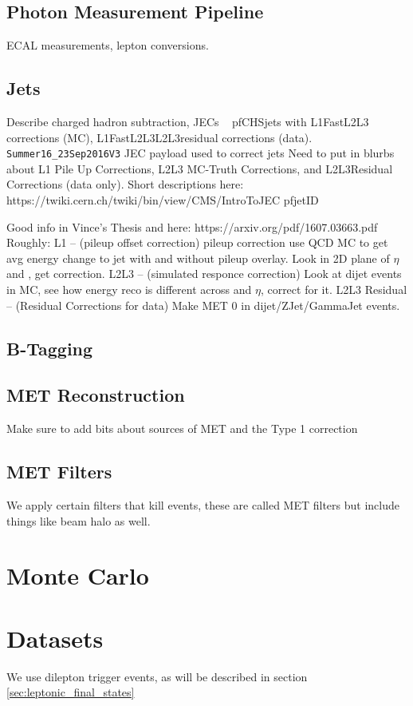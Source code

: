   \subsection{Photon Measurement Pipeline}
    ECAL measurements, lepton conversions.
  \subsection{Jets} \label{sec:jets}
    Describe charged hadron subtraction, JECs ~\cite{JERC}
    pfCHSjets with L1FastL2L3 corrections (MC), L1FastL2L3L2L3residual corrections (data).
    \verb=Summer16_23Sep2016V3= JEC payload used to correct jets
    Need to put in blurbs about L1 Pile Up Corrections, L2L3 MC-Truth Corrections, and L2L3Residual Corrections (data only). Short descriptions here: https://twiki.cern.ch/twiki/bin/view/CMS/IntroToJEC
    pfjetID


    Good info in Vince's Thesis and here: https://arxiv.org/pdf/1607.03663.pdf
    Roughly: L1 -- (pileup offset correction) pileup correction use QCD MC to get avg energy change to jet with and without pileup overlay. Look in 2D plane of $\eta$ and \pt, get correction.
    L2L3 -- (simulated responce correction) Look at dijet events in MC, see how energy reco is different across \pt and $\eta$, correct for it.
    L2L3 Residual -- (Residual Corrections for data) Make MET 0 in dijet/ZJet/GammaJet events.
  \subsection{B-Tagging} \label{sec:b-tagging}

  \subsection{MET Reconstruction} \label{sec:MET_reco}
    Make sure to add bits about sources of MET and the Type 1 correction
  \subsection{MET Filters} \label{sec:met_filters} 
    We apply certain filters that kill events, these are called MET filters but include things like beam halo as well.

\section{Monte Carlo}

\section{Datasets} \label{sec:datasets}
We use dilepton trigger events, as will be described in section \ref{sec:leptonic_final_states}